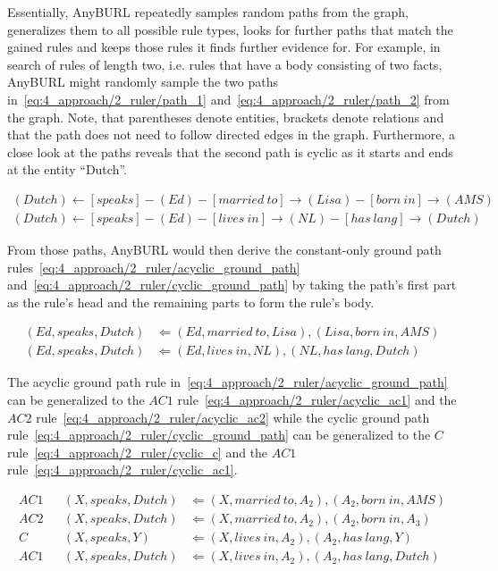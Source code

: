Essentially, AnyBURL repeatedly samples random paths from the graph, generalizes them to all possible rule types, looks for further paths that match the gained rules and keeps those rules it finds further evidence for. For example, in search of rules of length two, i.e. rules that have a body consisting of two facts, AnyBURL might randomly sample the two paths in~\ref{eq:4_approach/2_ruler/path_1} and~\ref{eq:4_approach/2_ruler/path_2} from the graph. Note, that parentheses denote entities, brackets denote relations and that the path does not need to follow directed edges in the graph. Furthermore, a close look at the paths reveals that the second path is cyclic as it starts and ends at the entity ``Dutch''.

\begin{align}
(Dutch)
    \leftarrow [speaks] - (Ed) - [married~to] \rightarrow (Lisa) - [born~in] \rightarrow (AMS)
    \label{eq:4_approach/2_ruler/path_1} \\
    (Dutch) \leftarrow [speaks] - (Ed) - [lives~in] \rightarrow (NL) - [has~lang] \rightarrow (Dutch)
    \label{eq:4_approach/2_ruler/path_2}
\end{align}

From those paths, AnyBURL would then derive the constant-only ground path rules~\ref{eq:4_approach/2_ruler/acyclic_ground_path} and~\ref{eq:4_approach/2_ruler/cyclic_ground_path} by taking the path's first part as the rule's head and the remaining parts to form the rule's body.

\begin{align}
(Ed, speaks, Dutch)
    &\Leftarrow (Ed, married~to, Lisa), (Lisa, born~in, AMS)
    \label{eq:4_approach/2_ruler/acyclic_ground_path} \\
    (Ed, speaks, Dutch) &\Leftarrow (Ed, lives~in, NL), (NL, has~lang, Dutch)
    \label{eq:4_approach/2_ruler/cyclic_ground_path}
\end{align}

The acyclic ground path rule in~\ref{eq:4_approach/2_ruler/acyclic_ground_path} can be generalized to the $AC1$ rule~\ref{eq:4_approach/2_ruler/acyclic_ac1} and the $AC2$ rule~\ref{eq:4_approach/2_ruler/acyclic_ac2} while the cyclic ground path rule~\ref{eq:4_approach/2_ruler/cyclic_ground_path} can be generalized to the $C$ rule~\ref{eq:4_approach/2_ruler/cyclic_c} and the $AC1$ rule~\ref{eq:4_approach/2_ruler/cyclic_ac1}.

\begin{align}
    AC1 && (X, speaks, Dutch) &\Leftarrow (X, married~to, A_2), (A_2, born~in, AMS)
    \label{eq:4_approach/2_ruler/acyclic_ac1} \\
    AC2 && (X, speaks, Dutch) &\Leftarrow (X, married~to, A_2), (A_2, born~in, A_3)
    \label{eq:4_approach/2_ruler/acyclic_ac2} \\
        C   && (X, speaks, Y) &\Leftarrow (X, lives~in, A_2), (A_2, has~lang, Y)
    \label{eq:4_approach/2_ruler/cyclic_c} \\
    AC1 && (X, speaks, Dutch) &\Leftarrow (X, lives~in, A_2), (A_2, has~lang, Dutch)
    \label{eq:4_approach/2_ruler/cyclic_ac1}
\end{align}

